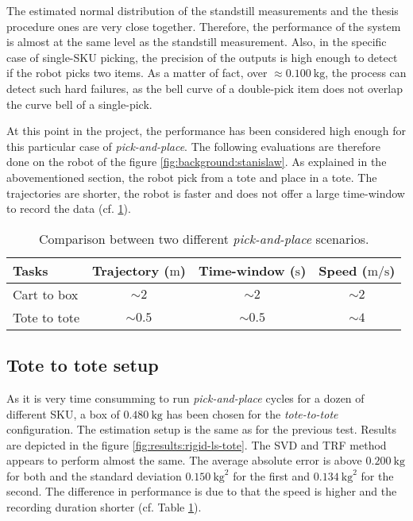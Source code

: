 \documentclass[/home/francois/latex/report/main.tex]{subfiles}
\begin{document}
The estimated normal distribution of the standstill measurements and the thesis procedure ones are very close together. Therefore, the performance of the system is almost at the same level as the standstill measurement. Also, in the specific case of single-\ac{SKU} picking, the precision of the outputs is high enough to detect if the robot picks two items. As a matter of fact, over $\approx 0.100 \ \si{\kilogram}$, the process can detect such hard failures, as the bell curve of a double-pick item does not overlap the curve bell of a single-pick.

At this point in the project, the performance has been considered high enough for this particular case of \textit{pick-and-place}. The following evaluations are therefore done on the robot of the figure \ref{fig:background:stanislaw}. As explained in the abovementioned section, the robot pick from a tote and place in a tote. The trajectories are shorter, the robot is faster and does not offer a large time-window to record the data (cf. \ref{tab:results:comparison-robot}).

\begin{table}[h]
  \begin{center}
    \renewcommand{\arraystretch}{1.2} %
    \begin{tabular}{l|c|c|c} %
      \textbf{Tasks} & \textbf{Trajectory ($\si{\meter}$)} & \textbf{Time-window ($\si{\second}$)} & \textbf{Speed ($\si{\meter\per\second}$)} \\
      \hline
      Cart to box & $\sim 2$ & $\sim 2$ & $\sim 2$ \\
      \hline
      Tote to tote & $\sim 0.5$ & $\sim 0.5$ & $\sim 4$ \\
      \hline
    \end{tabular}
  \end{center}
  \caption{Comparison between two different \textit{pick-and-place} scenarios.\label{tab:results:comparison-robot}}
\end{table}

\subsection{Tote to tote setup}
\label{results:tote}

As it is very time consumming to run \textit{pick-and-place} cycles for a dozen of different \ac{SKU}, a box of $0.480 \ \si{\kilogram}$ has been chosen for the \textit{tote-to-tote} configuration. The estimation setup is the same as for the previous test. Results are depicted in the figure \ref{fig:results:rigid-ls-tote}. The \ac{SVD} and \ac{TRF} method appears to perform almost the same. The average absolute error is above $0.200 \ \si{\kilogram}$ for both and the standard deviation $0.150 \ \si{\kilogram\squared}$ for the first and $0.134 \ \si{\kilogram\squared}$ for the second. The difference in performance is due to that the speed is higher and the recording duration shorter (cf. Table \ref{tab:results:comparison-robot}).
\end{document}
